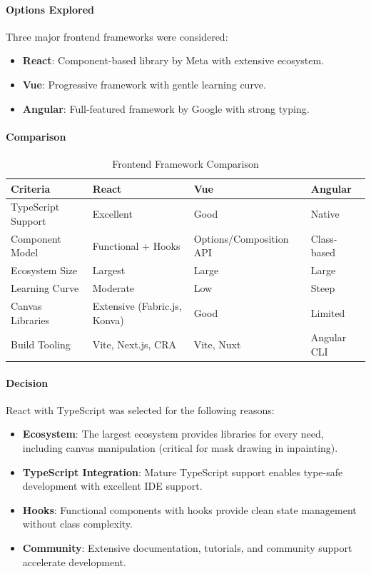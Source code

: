 \documentclass[12pt,a4paper]{report}
\begin{document}
\paragraph{Options Explored}

Three major frontend frameworks were considered:
\begin{itemize}
    \item \textbf{React}: Component-based library by Meta with extensive ecosystem.
    \item \textbf{Vue}: Progressive framework with gentle learning curve.
    \item \textbf{Angular}: Full-featured framework by Google with strong typing.
\end{itemize}

\paragraph{Comparison}

\begin{table}[H]
\centering
\caption{Frontend Framework Comparison}
\label{tab:frontend_framework}
\small
\renewcommand{\arraystretch}{1.3}
\begin{tabular}{|p{2.8cm}|p{3.5cm}|p{3.5cm}|p{3.2cm}|}
\hline
\textbf{Criteria} & \textbf{React} & \textbf{Vue} & \textbf{Angular} \\
\hline
TypeScript Support & Excellent & Good & Native \\
\hline
Component Model & Functional + Hooks & Options/Composition API & Class-based \\
\hline
Ecosystem Size & Largest & Large & Large \\
\hline
Learning Curve & Moderate & Low & Steep \\
\hline
Canvas Libraries & Extensive (Fabric.js, Konva) & Good & Limited \\
\hline
Build Tooling & Vite, Next.js, CRA & Vite, Nuxt & Angular CLI \\
\hline
\end{tabular}
\end{table}

\paragraph{Decision}

React with TypeScript was selected for the following reasons:
\begin{itemize}
    \item \textbf{Ecosystem}: The largest ecosystem provides libraries for every need, including canvas manipulation (critical for mask drawing in inpainting).
    \item \textbf{TypeScript Integration}: Mature TypeScript support enables type-safe development with excellent IDE support.
    \item \textbf{Hooks}: Functional components with hooks provide clean state management without class complexity.
    \item \textbf{Community}: Extensive documentation, tutorials, and community support accelerate development.
\end{itemize}
\end{document}
